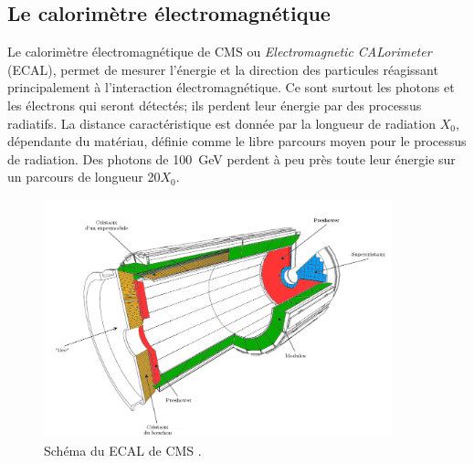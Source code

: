 \newpage
\subsection{Le calorimètre électromagnétique}
Le calorimètre électromagnétique de CMS ou \textit{Electromagnetic CALorimeter} (ECAL), permet de mesurer l'énergie et la direction des particules réagissant principalement à l'interaction électromagnétique. Ce sont surtout les photons et les électrons qui seront détectés; ils perdent leur énergie par des processus radiatifs. La distance caractéristique est donnée par la longueur de radiation $X_{0}$, dépendante du matériau, définie comme le libre parcours moyen pour le processus de radiation. Des photons de \SI{100}{\giga\eV} perdent à peu près toute leur énergie sur un parcours de longueur \num{20}$X_{0}$.
\begin{figure}[ht!]
	\centering
	\includegraphics[width=0.90\textwidth]{CMS/ECAL.png}
	\captionsetup{type=figure}\caption{Schéma du ECAL de CMS \cite{ECAL}.}
	\label{ECAL}
\end{figure}


